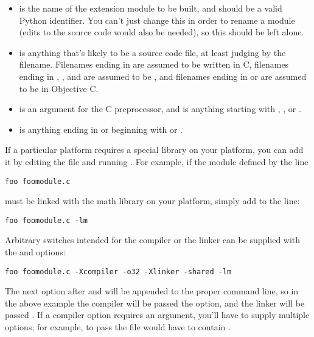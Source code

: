 \documentclass{howto}
\begin{document}
\begin{itemize}

\item {} is the name of the extension module to be built,
      and should be a valid Python identifier.  You can't just change
      this in order to rename a module (edits to the source code would
      also be needed), so this should be left alone.

\item {} is anything that's likely to be a source code
      file, at least judging by the filename.  Filenames ending in
       are assumed to be written in C, filenames ending in
      , , and  are assumed to be
      \Cpp, and filenames ending in  or  are
      assumed to be in Objective C.

\item {} is an argument for the C preprocessor, 
      and is anything starting with , ,
       or .

\item {} is anything ending in  or beginning with
       or .
\end{itemize}

If a particular platform requires a special library on your platform,
you can add it by editing the  file and running
.  For example, if the module defined by the line

\begin{verbatim}
foo foomodule.c
\end{verbatim}

must be linked with the math library  on your platform,
simply add  to the line:

\begin{verbatim}
foo foomodule.c -lm
\end{verbatim}

Arbitrary switches intended for the compiler or the linker can be
supplied with the   and
  options:

\begin{verbatim}
foo foomodule.c -Xcompiler -o32 -Xlinker -shared -lm
\end{verbatim}

The next option after  and
 will be appended to the proper command line, so
in the above example the compiler will be passed the 
option, and the linker will be passed .  If a
compiler option requires an argument, you'll have to supply multiple
 options; for example, to pass  the
 file would have to contain
.
\end{document}
